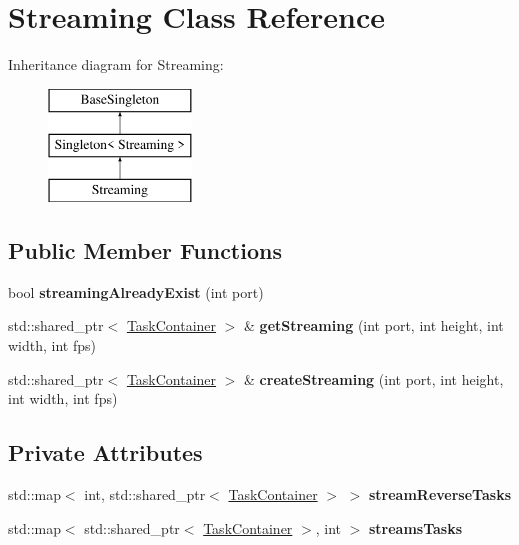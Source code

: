 \hypertarget{class_streaming}{}\section{Streaming Class Reference}
\label{class_streaming}
Inheritance diagram for Streaming\+:\begin{figure}[H]
\begin{center}
\leavevmode
\includegraphics[height=3.000000cm]{db/daf/class_streaming}
\end{center}
\end{figure}
\subsection*{Public Member Functions}
\begin{DoxyCompactItemize}
\item 
\mbox{\label{class_streaming_a1bfa8f42fbb89f828449105cb5744a66}} 
bool {\bfseries streaming\+Already\+Exist} (int port)
\item 
\mbox{\label{class_streaming_a23e6cd837b104831d535bea1f3581ad4}} 
std\+::shared\+\_\+ptr$<$ \hyperlink{class_task_container}{Task\+Container} $>$ \& {\bfseries get\+Streaming} (int port, int height, int width, int fps)
\item 
\mbox{\label{class_streaming_ac35022f95e214fba35a74c7d0dd871ae}} 
std\+::shared\+\_\+ptr$<$ \hyperlink{class_task_container}{Task\+Container} $>$ \& {\bfseries create\+Streaming} (int port, int height, int width, int fps)
\end{DoxyCompactItemize}
\subsection*{Private Attributes}
\begin{DoxyCompactItemize}
\item 
\mbox{\label{class_streaming_a2ef8d43f5b7038f67d294663874d8108}} 
std\+::map$<$ int, std\+::shared\+\_\+ptr$<$ \hyperlink{class_task_container}{Task\+Container} $>$ $>$ {\bfseries stream\+Reverse\+Tasks}
\item 
\mbox{\label{class_streaming_a75afeb3cc9c4c2ee6f784d68f69e56b5}} 
std\+::map$<$ std\+::shared\+\_\+ptr$<$ \hyperlink{class_task_container}{Task\+Container} $>$, int $>$ {\bfseries streams\+Tasks}
\end{DoxyCompactItemize}
